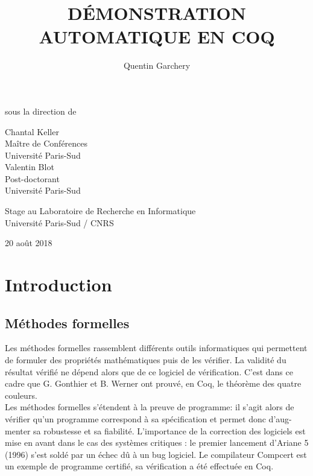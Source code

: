 \documentclass{article}
\title{ {\Large \textbf{DÉMONSTRATION AUTOMATIQUE EN COQ}} }
\date{}
\author{Quentin Garchery}
\begin{document}
\maketitle
\thispagestyle{empty}

\begin{center}
\normalsize sous la direction de \\

\vspace{7mm}

\begin{multicols}{2}
\large{Chantal Keller} \\
Maître de Conférences\\
Université Paris-Sud \\

\large{Valentin Blot} \\
Post-doctorant\\
Université Paris-Sud
\end{multicols}

\vspace{15mm}

\Large{Stage au Laboratoire de Recherche en Informatique\\
Université Paris-Sud / CNRS}


\vfill

\normalsize 20 août 2018

\end{center}
\newpage



\section{Introduction}

\subsection{Méthodes formelles}

Les méthodes formelles rassemblent différents outils informatiques qui permettent de formuler des propriétés mathématiques puis de les vérifier. La validité du résultat vérifié ne dépend alors que de ce logiciel de vérification. C'est dans ce cadre que G. Gonthier et B. Werner ont prouvé, en Coq, le théorème des quatre couleurs.\\

Les méthodes formelles s'étendent à la preuve de programme: il s'agit alors de vérifier qu'un programme correspond à sa spécification et permet donc d'aug-menter sa robustesse et sa fiabilité.
L'importance de la correction des logiciels est mise en avant dans le cas des systèmes critiques : le premier lancement d'Ariane 5 (1996) s'est soldé par un échec dû à un bug logiciel. Le compilateur Compcert est un exemple de programme certifié, sa vérification a été effectuée en Coq.\\
\end{document}
